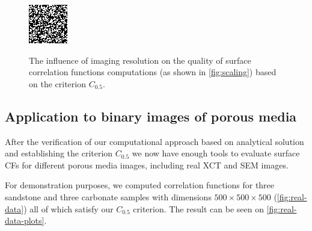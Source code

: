 \documentclass[reprint,amsmath,amssymb,aps,pre]{revtex4-1}
\begin{document}
\begin{figure}[t]
{    \includegraphics[width=0.475\linewidth]{images/disks-0015-5e-5-64.png}
    \label{fig:disks-64}}
  \caption[]{The influence of imaging resolution on the quality of surface
    correlation functions computations (as shown in \cref{fig:scaling}) based on
    the criterion $C_{0.5}$.}
  \label{fig:disks-res}
\end{figure}

\subsection{Application to binary images of porous media}
\label{sec:application}
After the verification of our computational approach based on analytical
solution and establishing the criterion $C_{0.5}$ we now have enough tools to
evaluate surface CFs for different porous media images, including real XCT and
SEM images.

For demonstration purposes, we computed correlation functions for three
sandstone and three carbonate samples with dimensions
$500 \times 500 \times 500$ (\cref{fig:real-data}) all of which satisfy our
$C_{0.5}$ criterion. The result can be seen on \cref{fig:real-data-plots}.
\end{document}
